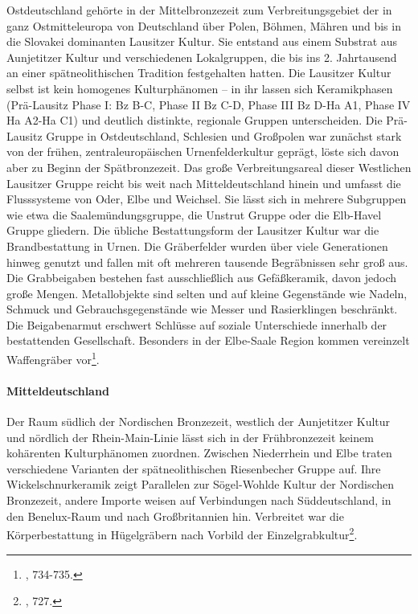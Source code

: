 \documentclass[openany,twoside,twocolumn]{book}
\let\rmarkdownfootnote\footnote%
\def\footnote{\protect\rmarkdownfootnote}
\begin{document}
Ostdeutschland gehörte in der Mittelbronzezeit zum Verbreitungsgebiet
der in ganz Ostmitteleuropa von Deutschland über Polen, Böhmen, Mähren
und bis in die Slovakei dominanten Lausitzer Kultur. Sie entstand aus
einem Substrat aus Aunjetitzer Kultur und verschiedenen Lokalgruppen,
die bis ins 2. Jahrtausend an einer spätneolithischen Tradition
festgehalten hatten. Die Lausitzer Kultur selbst ist kein homogenes
Kulturphänomen -- in ihr lassen sich Keramikphasen (Prä-Lausitz Phase I:
Bz B-C, Phase II Bz C-D, Phase III Bz D-Ha A1, Phase IV Ha A2-Ha C1) und
deutlich distinkte, regionale Gruppen unterscheiden. Die Prä-Lausitz
Gruppe in Ostdeutschland, Schlesien und Großpolen war zunächst stark von
der frühen, zentraleuropäischen Urnenfelderkultur geprägt, löste sich
davon aber zu Beginn der Spätbronzezeit. Das große Verbreitungsareal
dieser Westlichen Lausitzer Gruppe reicht bis weit nach
Mitteldeutschland hinein und umfasst die Flusssysteme von Oder, Elbe und
Weichsel. Sie lässt sich in mehrere Subgruppen wie etwa die
Saalemündungsgruppe, die Unstrut Gruppe oder die Elb-Havel Gruppe
gliedern. Die übliche Bestattungsform der Lausitzer Kultur war die
Brandbestattung in Urnen. Die Gräberfelder wurden über viele
Generationen hinweg genutzt und fallen mit oft mehreren tausende
Begräbnissen sehr groß aus. Die Grabbeigaben bestehen fast
ausschließlich aus Gefäßkeramik, davon jedoch große Mengen.
Metallobjekte sind selten und auf kleine Gegenstände wie Nadeln, Schmuck
und Gebrauchsgegenstände wie Messer und Rasierklingen beschränkt. Die
Beigabenarmut erschwert Schlüsse auf soziale Unterschiede innerhalb der
bestattenden Gesellschaft. Besonders in der Elbe-Saale Region kommen
vereinzelt Waffengräber vor\footnote{\textcite{jockenhovel_germany_2013},
  734-735.}.

\hypertarget{mitteldeutschland}{%
\paragraph{Mitteldeutschland}\label{mitteldeutschland}}

Der Raum südlich der Nordischen Bronzezeit, westlich der Aunjetitzer
Kultur und nördlich der Rhein-Main-Linie lässt sich in der
Frühbronzezeit keinem kohärenten Kulturphänomen zuordnen. Zwischen
Niederrhein und Elbe traten verschiedene Varianten der spätneolithischen
Riesenbecher Gruppe auf. Ihre Wickelschnurkeramik zeigt Parallelen zur
Sögel-Wohlde Kultur der Nordischen Bronzezeit, andere Importe weisen auf
Verbindungen nach Süddeutschland, in den Benelux-Raum und nach
Großbritannien hin. Verbreitet war die Körperbestattung in Hügelgräbern
nach Vorbild der Einzelgrabkultur\footnote{\textcite{jockenhovel_germany_2013},
  727.}.
\end{document}
